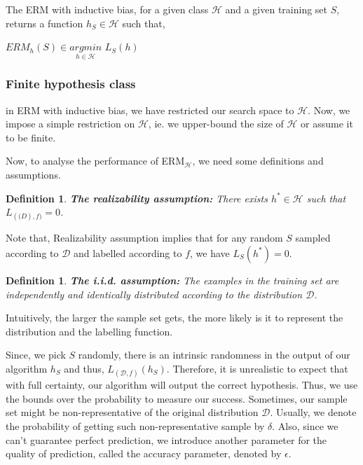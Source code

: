 \documentclass[a4paper]{article}
\newtheorem{definition}[theorem]{Definition}
\begin{document}
        The ERM with inductive bias, for a given class $\mathcal{H}$ and a given training set $S$, returns a function $h_S \in \mathcal{H}$ such that,
        \begin{center}
            $ERM_h(S) \in \underset{h \in \mathcal{H}}{argmin}$  \vspace{5px} $L_S(h)$
        \end{center}
        
        \subsubsection{Finite hypothesis class}
            in ERM with inductive bias, we have restricted our search space to $\mathcal{H}$. Now, we impose a simple restriction on $\mathcal{H}$, ie. we upper-bound the size of $\mathcal{H}$ or assume it to be finite.
            
            Now, to analyse the performance of ERM{$_\mathcal{H}$}, we need some definitions and assumptions.
            
            \begin{definition}
                \textbf{The realizability assumption: } There exists $h^* \in \mathcal{H}$ such that $L_{(\mathcal(D),f)} = 0$.
            \end{definition}
            
            Note that, Realizability assumption implies that for any random $S$ sampled according to $\mathcal{D}$ and labelled according to $f$, we have $L_S(h^*) = 0$.
            
            \begin{definition}
                \textbf{The i.i.d. assumption: } The examples in the training set are independently and identically distributed according to the distribution $\mathcal{D}$. 
            \end{definition}
            
            Intuitively, the larger the sample set gets, the more likely is it to represent the distribution and the labelling function.
            
            Since, we pick $S$ randomly, there is an intrinsic randomness in the output of our algorithm $h_S$ and thus, $L_{(\mathcal{D},f)}(h_S)$. Therefore, it is unrealistic to expect that with full certainty, our algorithm will output the correct hypothesis. Thus, we use the bounds over the probability to measure our success. Sometimes, our sample set might be non-representative of the original distribution $\mathcal{D}$.
            Usually, we denote the probability of getting such non-representative sample by $\delta$. Also, since we can't guarantee perfect prediction, we introduce another parameter for the quality of prediction, called the accuracy parameter, denoted by $\epsilon$.
            
\end{document}
